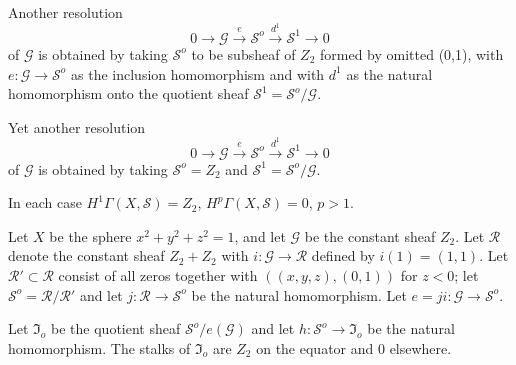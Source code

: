   Another resolution 
  \begin{equation*}
0 \to  \mathscr{G} \xrightarrow{e} \mathscr{S}^o \xrightarrow{d^1}
\mathscr{S}^1 \to 0 \tag{3} 
  \end{equation*}  
  of $\mathscr{G}$ is obtained by taking $\mathscr{S}^o$ to be
  subsheaf of $Z_2$  formed by omitted (0,1), with $e: \mathscr{G}
  \to \mathscr{S}^o$ as the inclusion homomorphism and with $d^1$ as
  the natural homomorphism onto the quotient sheaf $\mathscr{S}^1=
  \mathscr{S}^o /\mathscr{G}$. 
  
  Yet another  resolution 
  \begin{equation*}
0 \to  \mathscr{G} \xrightarrow{e} \mathscr{S}^o \xrightarrow{d^1}
\mathscr{S}^1 \to 0 \tag{4} 
  \end{equation*}  
  of $\mathscr{G}$ is obtained by taking $\mathscr{S}^o = Z_2$ and
  $\mathscr{S}^1 = \mathscr{S}^o/ \mathscr{G}$. 
  
  In each case $H^1 \Gamma (X, \mathscr{S}) = Z_2$, $H^p \Gamma (X,
  \mathscr{S})=0$, $p > 1$. 
  
  \begin{exam}%
Let $X$ be the sphere $x^2 +y^2+z^2=1$, and let $\mathscr{G}$ be the
constant sheaf $Z_2$. Let $ \mathscr{R}$ denote the constant sheaf
$Z_2 +Z_2$ with $i : \mathscr{G} \to \mathscr{R}$ defined by $i(1) =
(1,1)$. Let $\mathscr{R}' \subset \mathscr{R}$ consist\pageoriginale
of all zeros 
together with $((x,y,z), (0,1))$ for $z < 0$; let $\mathscr{S}^o=
\mathscr{R}/ \mathscr{R}'$ and let $j: \mathscr{R} \to \mathscr{S}^o$
be the natural  homomorphism. Let $e = ji:\mathscr{G} \to
\mathscr{S}^o$. 
  \end{exam}  
  
  Let $\mathfrak{I}_o$ be the quotient sheaf $\mathscr{S}^o /
  e(\mathscr{G})$ and let $h: \mathscr{S}^o \to \mathfrak{I}_o$ be the
  natural homomorphism. The stalks of $\mathfrak{I}_o$ are $Z_2$  on
  the equator and 0 elsewhere. 
  
